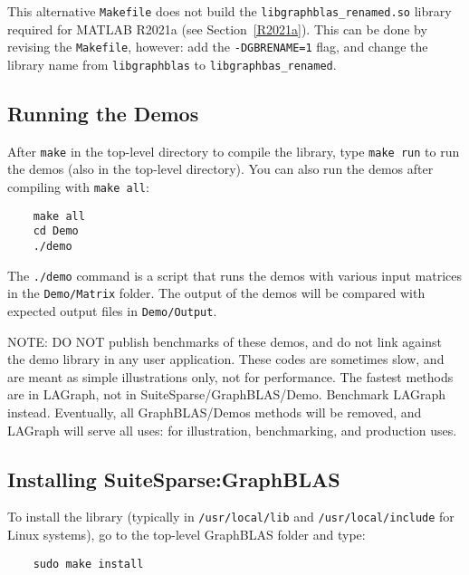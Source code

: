 \documentclass[12pt]{article}
\begin{document}
{This alternative \verb'Makefile' does not build the
\verb'libgraphblas_renamed.so' library required for MATLAB R2021a (see
Section~\ref{R2021a}).  This can be done by revising the \verb'Makefile',
however:  add the \verb'-DGBRENAME=1' flag, and change the library name
from \verb'libgraphblas' to \verb'libgraphbas_renamed'.

\subsection{Running the Demos}

After \verb'make' in the top-level directory to compile the library, type
\verb'make run' to run the demos (also in the top-level directory).
You can also run the demos after compiling with \verb'make all':

    {\small
    \begin{verbatim}
    make all
    cd Demo
    ./demo \end{verbatim} }

The \verb'./demo' command is a script that runs the demos with various input
matrices in the \verb'Demo/Matrix' folder.  The output of the demos will be
compared with expected output files in \verb'Demo/Output'.

NOTE:
DO NOT publish benchmarks of these demos, and do not link against the
demo library in any user application.  These codes are sometimes slow,
and are meant as simple illustrations only, not for performance.  The fastest
methods are in LAGraph, not in SuiteSparse/GraphBLAS/Demo.  Benchmark LAGraph
instead.  Eventually, all GraphBLAS/Demos methods will be removed, and LAGraph
will serve all uses: for illustration, benchmarking, and production uses.

\subsection{Installing SuiteSparse:GraphBLAS}

To install the library (typically in \verb'/usr/local/lib' and
\verb'/usr/local/include' for Linux systems), go to the top-level GraphBLAS
folder and type:

    {\small
    \begin{verbatim}
    sudo make install \end{verbatim} }

}
\end{document}
